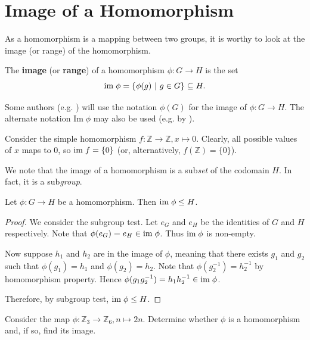 \section{Image of a Homomorphism}
As a homomorphism is a mapping between two groups, it is worthy to look at the image (or range) of the homomorphism.
\begin{definition}
    The \textbf{image} (or \textbf{range}) of a homomorphism $\phi: G \to H$ is the set
    \[
        \mathrm{im}\;\phi = \{\phi(g) \ | \ g \in G\} \subseteq H.
    \]
\end{definition}
\begin{remark}
    Some authors (e.g. \cite{libretexts_imandker}) will use the notation $\phi(G)$ for the image of $\phi: G \to H$. The alternate notation $\mathrm{Im}\;\phi$ may also be used (e.g. by \cite{clark_1984, hungerford_1980}).
\end{remark}

\begin{example}
    Consider the simple homomorphism $f: \mathbb{Z} \to \mathbb{Z}, x \mapsto 0$. Clearly, all possible values of $x$ maps to 0, so $\mathrm{im}\; f = \{0\}$ (or, alternatively, $f(\mathbb{Z}) = \{0\}$).
\end{example}

We note that the image of a homomorphism is a sub\textit{set} of the codomain $H$. In fact, it is a sub\textit{group}.
\begin{proposition}\label{prop-image-is-subgroup-of-codomain}
    Let $\phi: G \to H$ be a homomorphism. Then $\mathrm{im}\;\phi \leq H$.
\end{proposition}
\begin{proof}
    We consider the subgroup test. Let $e_G$ and $e_H$ be the identities of $G$ and $H$ respectively. Note that $\phi(e_G) = e_H \in \mathrm{im}\;\phi$. Thus $\mathrm{im}\;\phi$ is non-empty.

    Now suppose $h_1$ and $h_2$ are in the image of $\phi$, meaning that there exists $g_1$ and $g_2$ such that $\phi(g_1) = h_1$ and $\phi(g_2) = h_2$. Note that $\phi(g_2^{-1}) = h_2^{-1}$ by homomorphism property. Hence $\phi(g_1g_2^{-1}) = h_1h_2^{-1} \in \mathrm{im}\;\phi$.

    Therefore, by subgroup test, $\mathrm{im}\;\phi \leq H$.
\end{proof}

\begin{exercise}
    Consider the map $\phi: \mathbb{Z}_3 \to \mathbb{Z}_6, n \mapsto 2n$. Determine whether $\phi$ is a homomorphism and, if so, find its image.
\end{exercise}

